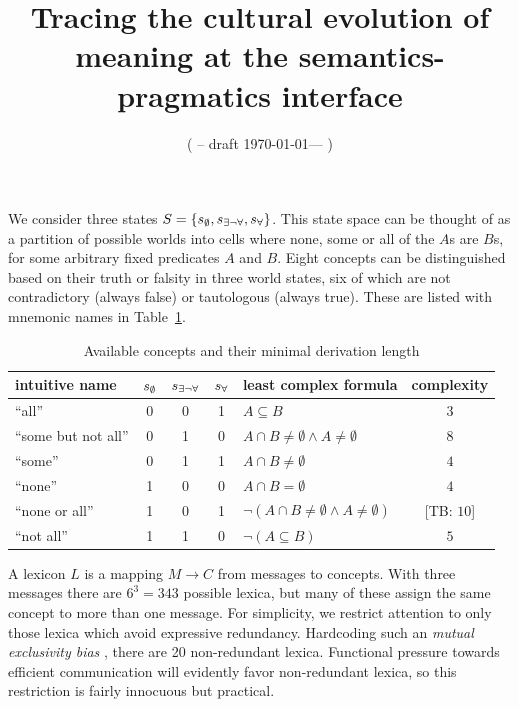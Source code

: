 \documentclass[a4paper]{article}
\title{Tracing the cultural evolution of meaning at the semantics-pragmatics interface}
\author{%
    ( -- draft \today --- )
}
\date{}
\newcommand{\tb}[1]{\textcolor[rgb]{.8,.33,.0}{[TB: #1]}}%
\newcommand{\set}[1]{\left\{#1\right\}}
\newcommand{\States}{\ensuremath{S}\xspace}		%
\newcommand{\state}{\ensuremath{s}\xspace}		%
\newcommand{\mystate}[1]{\ensuremath{\state_{\text{#1}}}\xspace} %
\newcommand{\Messgs}{\ensuremath{M}\xspace}		%
\newcommand{\ssome}{\mystate{\ensuremath{\exists\neg\forall}}}
\newcommand{\sall}{\mystate{\ensuremath{\forall}}}
\newcommand{\snone}{\mystate{\ensuremath{\emptyset}}}
\begin{document}
We consider three states $\States = \set{\snone, \ssome, \sall}$. This state space can be
thought of as a partition of possible worlds into cells where none, some or all of the $A$s are
$B$s, for some arbitrary fixed predicates $A$ and $B$. Eight concepts can be distinguished
based on their truth or falsity in three world states, six of which are not contradictory
(always false) or tautologous (always true). These are listed with mnemonic names in
Table~\ref{tab:concepts}. 

\begin{table}
  \centering
\begin{center}
  \begin{tabular}{lccclc}
    \toprule
    intuitive name
    & \snone
    & \ssome
    & \sall
    & least complex formula
    & complexity
    \\ \midrule
    ``all''
    & 0
    & 0
    & 1
    & $A \subseteq B$
    & $3$
    \\
    ``some but not all''
    & 0
    & 1
    & 0
    & $A \cap B \neq \emptyset \wedge A \neq \emptyset$
    & $8$
    \\    
    ``some''
    & 0
    & 1
    & 1
    & $A \cap B \neq \emptyset$
    & $4$
    \\
    ``none''
    & 1
    & 0
    & 0
    & $A \cap B = \emptyset$
    & $4$
    \\
    ``none or all''
    & 1
    & 0
    & 1
    & $\neg(A \cap B \neq \emptyset \wedge A \neq \emptyset)$
    & \tb{$10$}
    \\
    ``not all''
    & 1
    & 1
    & 0
    & $\neg (A \subseteq B)$
    & $5$
    \\
    \bottomrule
  \end{tabular}
\end{center}
\caption{Available concepts and their minimal derivation length}
\label{tab:concepts}
\end{table}

A lexicon $L$ is a mapping $\Messgs \rightarrow C$ from messages to concepts. With three
messages there are $6^3 = 343$ possible lexica, but many of these assign the same concept to
more than one message. For simplicity, we restrict attention to only those lexica which avoid
expressive redundancy. Hardcoding such an \emph{mutual exclusivity bias}
\citep[e.g.][]{Clark2009:Lexical-Meaning}, there are 20 non-redundant lexica. Functional
pressure towards efficient communication will evidently favor non-redundant lexica, so this
restriction is fairly innocuous but practical.
\end{document}
